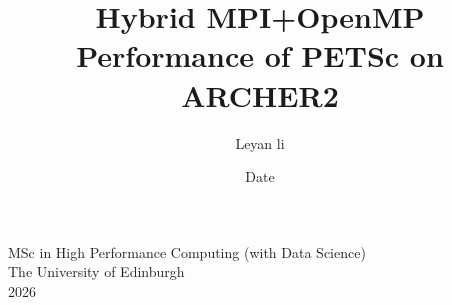 \documentclass[12pt,a4paper,notitlepage]{report}
\begin{document}
\indentedparagraphing


%
\title{Hybrid MPI+OpenMP Performance of PETSc on ARCHER2}
\author{Leyan li}
\date{Date} 


\makeEPCCtitle 

\thispagestyle{empty} 

%
\vspace{5cm} %

\begin{center}

\large{MSc in High Performance Computing (with Data Science)} \\ 
\large{The University of Edinburgh} \\ %
\large{2026} \\ %

\end{center}


\setcounter{page}{0}
\newpage
\end{document}
